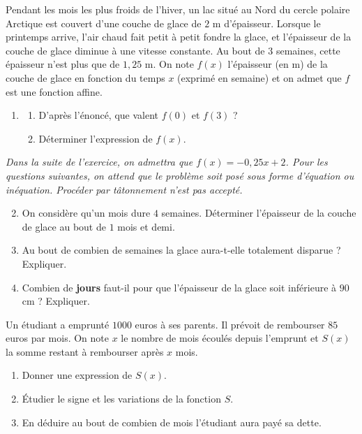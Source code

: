 \documentclass[11pt]{article}
\begin{document}
\begin{exo}
Pendant les mois les plus froids de l'hiver, un lac situé au
Nord du cercle polaire Arctique est couvert d’une couche de glace de $2$ m 
d'épaisseur. Lorsque le printemps arrive, l'air chaud fait petit à petit fondre
la glace, et l'épaisseur de la couche de glace diminue à une vitesse constante.
Au bout de $3$ semaines, cette épaisseur n'est plus que de $1,25$ m. On note
$f(x)$ l'épaisseur (en m) de la couche de glace en fonction du temps $x$
(exprimé en semaine) et on admet que $f$ est une fonction affine.
\begin{enumerate}
  \item \begin{enumerate}
      \item D'après l'énoncé, que valent $f(0)$ et $f(3)$ ?
      \item Déterminer l'expression de $f(x)$.
    \end{enumerate}
\end{enumerate}
\emph{Dans la suite de l'exercice, on admettra que $f(x)=-0,25x+2$. Pour les
questions suivantes, on attend que le problème soit posé sous forme d'équation
ou inéquation. Procéder par t\^atonnement n'est pas accepté.}
\begin{enumerate}
    \setcounter{enumi}{1}
  \item On considère qu'un mois dure $4$ semaines. Déterminer l'épaisseur de la
    couche de glace au bout de $1$ mois et demi.
  \item Au bout de combien de semaines la glace aura-t-elle totalement disparue
    ? Expliquer.
  \item Combien de \textbf{jours} faut-il pour que l'épaisseur de la glace soit
    inférieure à $90$ cm ? Expliquer.
\end{enumerate}
\end{exo}

\begin{exo}
Un étudiant a emprunté $1000$ euros à ses parents. Il
prévoit de rembourser $85$ euros par mois. On note $x$ le nombre de mois écoulés
depuis l'emprunt et $S(x)$ la somme restant à rembourser après $x$ mois.
\begin{enumerate}
  \item Donner une expression de $S(x)$.
  \item Étudier le signe et les variations de la fonction $S$.
  \item En déduire au bout de combien de mois l'étudiant aura payé sa dette.
\end{enumerate}
\end{exo}
\end{document}
